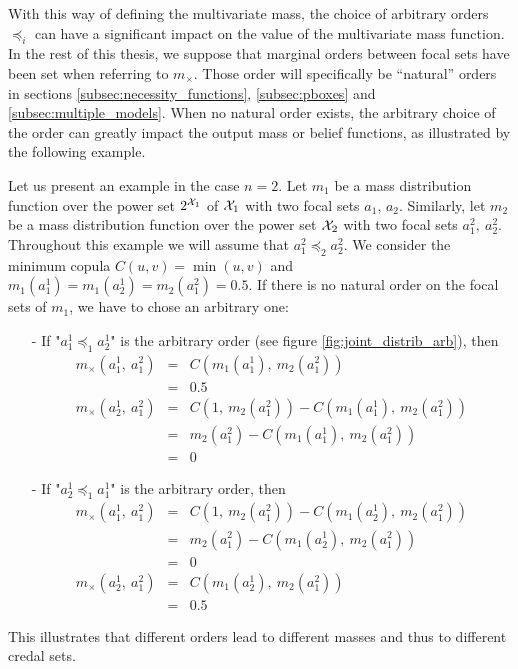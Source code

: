 With this way of defining the multivariate mass, the choice of arbitrary orders $\preceq_i$ can have a significant impact on the value of the multivariate mass function. In the rest of this thesis, we suppose that marginal orders between focal sets have been set when referring to $m_\times$. Those order will specifically be ``natural'' orders in sections \ref{subsec:necessity_functions}, \ref{subsec:pboxes} and \ref{subsec:multiple_models}. When no natural order exists, the arbitrary choice of the order can greatly impact the output mass or belief functions, as illustrated by the following example.

\begin{example}\label{ex:joint_mass}
    Let us present an example in the case $n=2$. Let $m_1$ be a mass distribution function over the power set $2^{{\mathcal{X}}_1}$ of ${\mathcal{X}}_1$ with two focal sets $a_1,\, a_2$. Similarly, let $m_2$ be a mass distribution function over the power set ${\mathcal{X}}_2$ with two focal sets $a_1^2,~a_2^2$. Throughout this example we will assume that $a_1^2\preceq_2a_2^2$. We consider the minimum copula $C(u,v)=\min(u,v)$ and $m_1(a_1^1)=m_1(a_2^1)=m_2(a_1^2)=0.5$.
    If there is no natural order on the focal sets of $m_1$, we have to chose an arbitrary one:
    \begin{itemize}
        \item[-] If "$a_1^1\preceq_1a_2^1$" is the arbitrary order (see figure \ref{fig:joint_distrib_arb}), then
        \begin{eqnarray*}
            m_\times(a_1^1,~a_1^2) &=& C(m_1(a_1^1),~m_2(a_1^2))\\
            &=& 0.5\\
            m_\times(a_2^1,~a_1^2) &=& C(1,~m_2(a_1^2)) - C(m_1(a_1^1),~m_2(a_1^2))\\
            &=& m_2(a_1^2) - C(m_1(a_1^1),~m_2(a_1^2))\\
            &=& 0
        \end{eqnarray*}
        \item[-] If "$a_2^1\preceq_1a_1^1$" is the arbitrary order, then
        \begin{eqnarray*}
            m_\times(a_1^1,~a_1^2) &=& C(1,~m_2(a_1^2)) - C(m_1(a_2^1),~m_2(a_1^2))\\
            &=& m_2(a_1^2) - C(m_1(a_2^1),~m_2(a_1^2))\\
            &=& 0\\
            m_\times(a_2^1,~a_1^2) &=& C(m_1(a_2^1),~m_2(a_1^2))\\
            &=& 0.5
        \end{eqnarray*}
    \end{itemize}
    This illustrates that different orders lead to different masses and thus to different credal sets.
    

\end{example}
